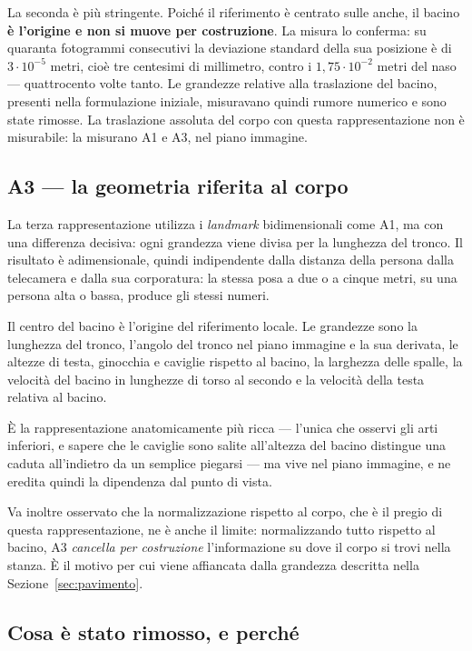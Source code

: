 La seconda è più stringente. Poiché il riferimento è centrato sulle anche, il
bacino \textbf{è l'origine e non si muove per costruzione}. La misura lo
conferma: su quaranta fotogrammi consecutivi la deviazione standard della sua
posizione è di $3\cdot10^{-5}$ metri, cioè tre centesimi di millimetro, contro i
$1{,}75\cdot10^{-2}$ metri del naso — quattrocento volte tanto. Le grandezze
relative alla traslazione del bacino, presenti nella formulazione iniziale,
misuravano quindi rumore numerico e sono state rimosse. La traslazione assoluta
del corpo con questa rappresentazione non è misurabile: la misurano A1 e A3, nel
piano immagine.

\subsection{A3 --- la geometria riferita al corpo}

La terza rappresentazione utilizza i \emph{landmark} bidimensionali come A1, ma
con una differenza decisiva: ogni grandezza viene divisa per la lunghezza del
tronco. Il risultato è adimensionale, quindi indipendente dalla distanza della
persona dalla telecamera e dalla sua corporatura: la stessa posa a due o a
cinque metri, su una persona alta o bassa, produce gli stessi numeri.

Il centro del bacino è l'origine del riferimento locale. Le grandezze sono la
lunghezza del tronco, l'angolo del tronco nel piano immagine e la sua derivata,
le altezze di testa, ginocchia e caviglie rispetto al bacino, la larghezza delle
spalle, la velocità del bacino in lunghezze di torso al secondo e la velocità
della testa relativa al bacino.

È la rappresentazione anatomicamente più ricca — l'unica che osservi gli arti
inferiori, e sapere che le caviglie sono salite all'altezza del bacino
distingue una caduta all'indietro da un semplice piegarsi — ma vive nel piano
immagine, e ne eredita quindi la dipendenza dal punto di vista.

Va inoltre osservato che la normalizzazione rispetto al corpo, che è il pregio
di questa rappresentazione, ne è anche il limite: normalizzando tutto rispetto
al bacino, A3 \emph{cancella per costruzione} l'informazione su dove il corpo si
trovi nella stanza. È il motivo per cui viene affiancata dalla grandezza
descritta nella Sezione~\ref{sec:pavimento}.

\subsection{Cosa è stato rimosso, e perché}

